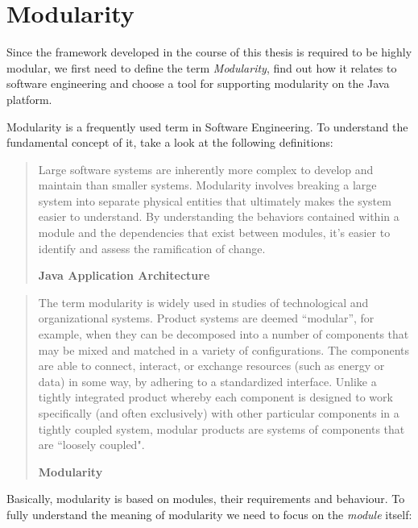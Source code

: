 \section{Modularity}
\label{sec:modularity}


Since the framework developed in the course of this thesis is required to be highly modular, we first need to define the term \textit{Modularity}, find out how it relates to software engineering and choose a tool for supporting modularity on the Java platform.

Modularity is a frequently used term in Software Engineering. To understand the fundamental concept of it, take a look at the following definitions:

\begin{quote}
Large software systems are inherently more complex to develop and maintain than smaller systems. Modularity involves breaking a large system into separate physical entities that ultimately makes the system easier to understand. By understanding the behaviors contained within a module and the dependencies that exist between modules, it’s easier to identify and assess the ramification of change.

\hfill \textbf{Java Application Architecture}

\hfill \citeauthor{Knoernschild:2012} \cite{Knoernschild:2012}
\end{quote}

\begin{quote}
The term modularity is widely used in studies of technological and organizational systems. Product systems are deemed “modular”, for example, when they can be decomposed into a number of components that may be mixed and matched in a variety of configurations. The components are able to connect, interact, or exchange resources (such as energy or data) in some way, by adhering to a standardized interface. Unlike a tightly integrated product whereby each component is designed to work specifically (and often exclusively) with other particular components in a tightly coupled system, modular products are systems of components that are “loosely coupled".

\hfill \textbf{Modularity}

\hfill \citeauthor{Wikipedia:Modularity:2012} \cite{Wikipedia:Modularity:2012}
\end{quote}

Basically, modularity is based on modules, their requirements and behaviour. To fully understand the meaning of modularity we need to focus on the \textit{module} itself:

